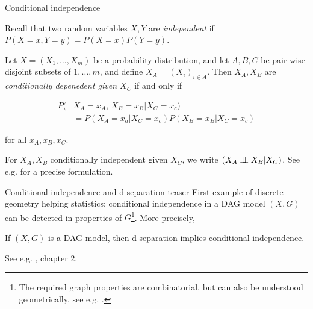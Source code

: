 \begin{frame}{Conditional independence}

  Recall that two random variables $X, Y$ are \emph{independent} if $P(X=x, Y=y) = P(X=x) P(Y=y)$.

  \begin{definition}
    Let $X = (X_1, \ldots, X_m)$ be a probability distribution, and let $A, B, C$ be pair-wise disjoint subsets of ${1, \ldots, m}$, and define $X_A = (X_i)_{i \in A}$. Then $X_A, X_B$ are \emph{conditionally depenedent given $X_C$} if and only if

    \begin{align*}
      P(&X_A = x_A,  \,X_B = x_B | X_C = x_c) \\
      &= P(X_A = x_a | X_C = x_c) P(X_B = x_B | X_C = x_c)
    \end{align*}

    for all $x_A, x_B, x_C$.\newline
  \end{definition}

  For $X_A, X_B$ conditionally independent given $X_C$, we write $(X_A \perp\!\!\!\perp X_B | X_C)$. See e.g. \cite{drton2008lectures} for a precise formulation.
\end{frame}

\begin{frame}{Conditional independence and d-separation teaser}
  First example of discrete geometry helping statistics: conditional independence in a DAG model $(X, G)$ can be detected in properties of $G$\footnote{The required graph properties are combinatorial, but can also be understood geometrically, see e.g. \cite{drton2008lectures}.}. More precisely,

  \begin{theorem}
    If $(X, G)$ is a DAG model, then d-separation implies conditional independence.
  \end{theorem}
  See e.g. \cite{pearl2016causal}, chapter 2.
\end{frame}


